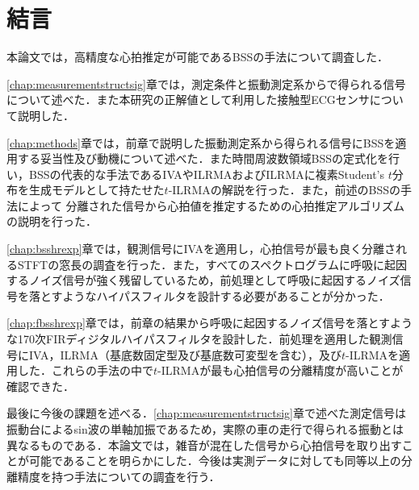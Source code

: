 \chapter{結言}
\label{chap:con}

本論文では，高精度な心拍推定が可能であるBSSの手法について調査した．

\ref{chap:measurementstructsig}章では，測定条件と振動測定系からで得られる信号について述べた．また本研究の正解値として利用した接触型ECGセンサについて説明した．

\ref{chap:methods}章では，前章で説明した振動測定系から得られる信号にBSSを適用する妥当性及び動機について述べた．また時間周波数領域BSSの定式化を行い，BSSの代表的な手法であるIVAやILRMAおよびILRMAに複素Student's $t$分布を生成モデルとして持たせた$t$-ILRMAの解説を行った．また，前述のBSSの手法によって
分離された信号から心拍値を推定するための心拍推定アルゴリズムの説明を行った．

\ref{chap:bsshrexp}章では，観測信号にIVAを適用し，心拍信号が最も良く分離されるSTFTの窓長の調査を行った．また，すべてのスペクトログラムに呼吸に起因するノイズ信号が強く残留しているため，前処理として呼吸に起因するノイズ信号を落とすようなハイパスフィルタを設計する必要があることが分かった．

\ref{chap:fbsshrexp}章では，前章の結果から呼吸に起因するノイズ信号を落とすような170次FIRディジタルハイパスフィルタを設計した．前処理を適用した観測信号にIVA，ILRMA（基底数固定型及び基底数可変型を含む），及び$t$-ILRMAを適用した．これらの手法の中で$t$-ILRMAが最も心拍信号の分離精度が高いことが確認できた．

最後に今後の課題を述べる．\ref{chap:measurementstructsig}章で述べた測定信号は振動台によるsin波の単軸加振であるため，実際の車の走行で得られる振動とは異なるものである．本論文では，雑音が混在した信号から心拍信号を取り出すことが可能であることを明らかにした．今後は実測データに対しても同等以上の分離精度を持つ手法についての調査を行う．